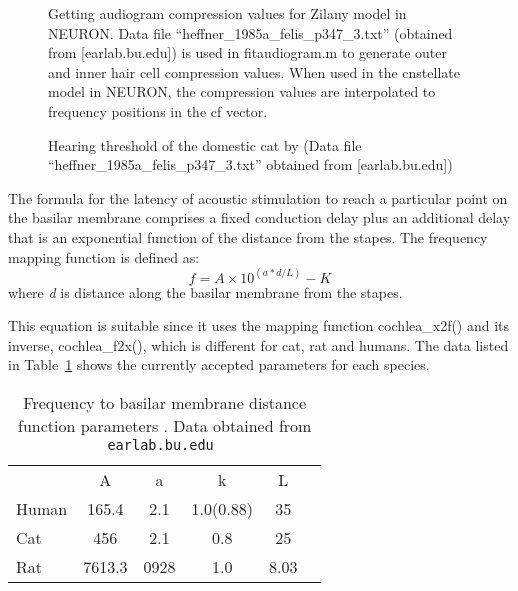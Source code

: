 \begin{figure}[htb]
  \begin{center}
    \caption{Getting audiogram compression values for Zilany model in
      NEURON\@. Data file \mbox{\textsf{``heffner\_1985a\_felis\_p347\_3.txt''}} (obtained
      from [earlab.bu.edu]) is used in \textsf{fitaudiogram.m} to generate outer
      and inner hair cell compression values. When used in the
      \textsf{cnstellate} model in NEURON, the compression values are
      interpolated to frequency positions in the \textsf{cf}
      vector.}\label{fig:GetAudiogram}
  \end{center}
\end{figure}



\medskip{}

\begin{figure}[htb]
  \begin{center}
    \caption{Hearing threshold of the domestic cat by \citet{HeffnerHeffner:1985} (Data file
      \mbox{\textsf{``heffner\_1985a\_felis\_p347\_3.txt''}} obtained from
      [earlab.bu.edu])}
    \label{fig:AudThresholdRat}
  \end{center}
\end{figure}


The formula for the latency of acoustic stimulation to reach a particular point
on the basilar membrane comprises a fixed conduction delay plus an additional
delay that is an exponential function of the distance from the stapes. The
frequency mapping function is defined as:
\begin{equation}
  \label{eq:delay}
 f = A\times10^{\left(a*d/L\right)} - K  
\end{equation}
where \emph{d} is distance along the basilar membrane from the stapes.

\medskip{}

This equation is suitable since it uses the mapping function
\mbox{\textsf{cochlea\_x2f()}} and its inverse, \mbox{\textsf{cochlea\_f2x()}},
which is different for cat, rat and humans.  The data listed in
Table~\ref{tab:f2x} shows the currently accepted parameters for each species.


\begin{table}[ht]
  \centering
  \begin{tabular}{lccccc}
\hline
      &   A   &   a  &     k     & L \\
Human & 165.4 &  2.1 & 1.0(0.88) & 35\\
 Cat  &  456  &  2.1 &    0.8    & 25 \\
 Rat  & 7613.3& 0928 &    1.0    & 8.03 \\
\hline
\end{tabular}
  \caption{Frequency to basilar membrane distance function parameters \citep{FitzGeraldBurkittEtAl:2001}. Data obtained from \tt{earlab.bu.edu} \label{tab:f2x}}
\end{table}

